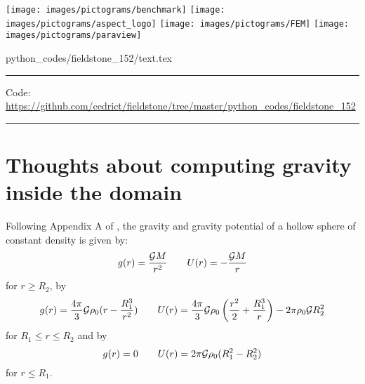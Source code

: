 \noindent
\texttt{[image: images/pictograms/benchmark]}
\texttt{[image: images/pictograms/aspect\_logo]}
\texttt{[image: images/pictograms/FEM]}
\texttt{[image: images/pictograms/paraview]}



\begin{flushright} {\tiny {\color{gray} python\_codes/fieldstone\_152/text.tex}} \end{flushright}



\par\noindent\rule{\textwidth}{0.4pt}

\begin{center}
\inpython
{\small Code: \url{https://github.com/cedrict/fieldstone/tree/master/python_codes/fieldstone_152}}
\end{center}

\par\noindent\rule{\textwidth}{0.4pt}

































\newpage
\section*{Thoughts about computing gravity inside the domain}

Following Appendix A of \textcite{thie18}, the gravity and
gravity potential of a hollow sphere of constant 
density is given by:
\[
g(r)=\frac{{\cal G}M}{r^2}
\qquad
U(r)=-\frac{{\cal G}M}{r}
\]
for $r\ge R_2$, by 
\[
g(r)=\frac{4 \pi}{3} {\cal G} \rho_0 (r-\frac{R_1^3}{r^2})
\qquad
U(r)=\frac{4\pi}{3}{\cal G} \rho_0 \left( \frac{r^2}{2}+ \frac{R_1^3}{r} \right)
-2 \pi \rho_0 {\cal G}R_2^2
\]
for $R_1\le r \le R_2$ and by 
\[
g(r)=0
\qquad
U(r)=2\pi {\cal G} \rho_0 (R_1^2-R_2^2)
\]
for $r\le R_1$.

